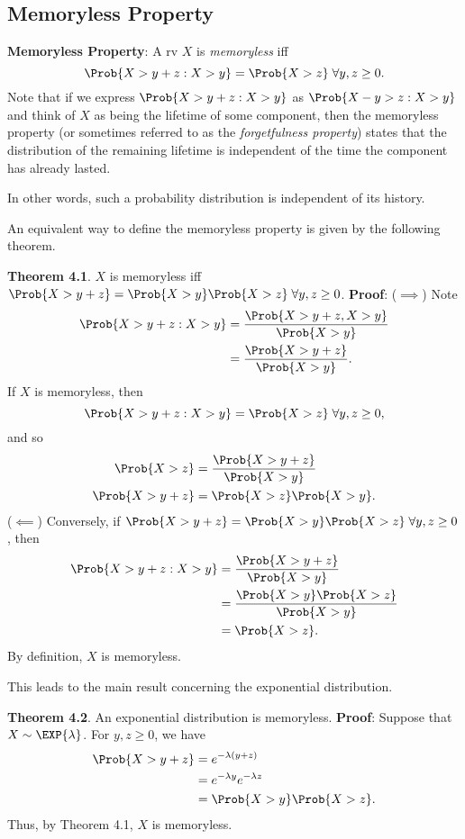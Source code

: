 \subsection*{Memoryless Property}
\begin{Regular}
    \textbf{Memoryless Property}: A rv $ X $ is \emph{memoryless} iff
    \[ \Prob{X>y+z\given X>y}=\Prob{X>z}\;\forall y,z\ge 0. \]
    Note that if we express $ \Prob{X>y+z\given X>y} $ as $ \Prob{X-y>z\given X>y} $ and think of $X$ as being
    the lifetime of some component, then the memoryless property (or sometimes referred to as
    the \emph{forgetfulness property}) states that the distribution of the remaining lifetime is independent
    of the time the component has already lasted.

    In other words, such a probability distribution is independent of its history.
\end{Regular}
An equivalent way to define the memoryless property is given by the following theorem.
\begin{Result}
    \textbf{Theorem 4.1}. $ X $ is memoryless iff $ \Prob{X>y+z}=\Prob{X>y}\Prob{X>z}\; \forall y,z\ge 0 $.
    \tcblower{}
    \textbf{Proof}: ($ \implies $) Note
    \begin{align*}
        \Prob{X>y+z\given X>y}
         & =\frac{\Prob{X>y+z,X>y}}{\Prob{X>y}} \\
         & =\frac{\Prob{X>y+z}}{\Prob{X>y}}.
    \end{align*}
    If $ X $ is memoryless, then
    \[ \Prob{X>y+z\given X>y}=\Prob{X>z}\;\forall y,z\ge 0, \]
    and so
    \begin{align*}
        \Prob{X>z}
                     & =\frac{\Prob{X>y+z}}{\Prob{X>y}} \\
        \Prob{X>y+z} & =\Prob{X>z}\Prob{X>y}.
    \end{align*}
    ($ \impliedby $) Conversely, if $ \Prob{X>y+z}=\Prob{X>y}\Prob{X>z}\; \forall y,z\ge 0 $,
    then
    \begin{align*}
        \Prob{X>y+z\given X>y}
         & =\frac{\Prob{X>y+z}}{\Prob{X>y}}         \\
         & =\frac{\Prob{X>y}\Prob{X>z}}{\Prob{X>y}} \\
         & =\Prob{X>z}.
    \end{align*}
    By definition, $ X $ is memoryless.
\end{Result}
This leads to the main result concerning the exponential distribution.
\begin{Result}
    \textbf{Theorem 4.2}. An exponential distribution is memoryless.
    \tcblower{}
    \textbf{Proof}: Suppose that $ X \sim \EXP{\lambda} $. For $ y,z\ge 0 $, we have
    \begin{align*}
        \Prob{X>y+z}
         & =e^{-\lambda(y+z)}            \\
         & =e^{-\lambda y}e^{-\lambda z} \\
         & =\Prob{X>y}\Prob{X>z}.
    \end{align*}
    Thus, by Theorem 4.1, $ X $ is memoryless.
\end{Result}
